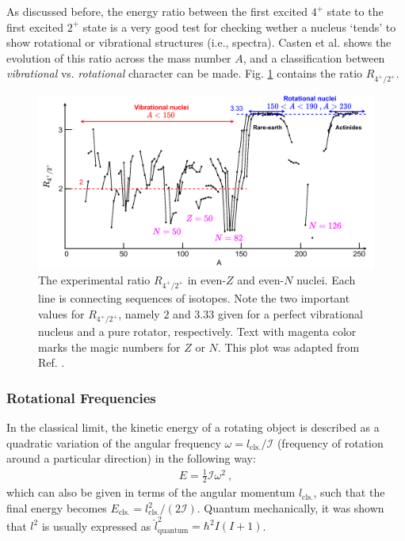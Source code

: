 As discussed before, the energy ratio between the first excited $4^+$ state to the first excited $2^+$ state is a very good test for checking wether a nucleus `tends' to show rotational or vibrational structures (i.e., spectra). Casten et al. \cite{casten2000nuclear} shows the evolution of this ratio across the mass number $A$, and a classification between \emph{vibrational} vs. \emph{rotational} character can be made. Fig. \ref{4state-2state-ratio} contains the ratio $R_{4^+/2^+}$.

\begin{figure}
    \centering
    \includegraphics[scale=0.251]{Chapters/Figures/vibrations_rotations_E42-ratio.pdf}
    \caption{The experimental ratio $R_{4^+/2^+}$ in even-$Z$ and even-$N$ nuclei. Each line is connecting sequences of isotopes. Note the two important values for $R_{4^+/2^+}$, namely $2$ and $3.33$ given for a perfect vibrational nucleus and a pure rotator, respectively. Text with magenta color marks the magic numbers for $Z$ or $N$. This plot was adapted from Ref. \cite{casten2000nuclear}.}
    \label{4state-2state-ratio}
\end{figure}

\subsubsection*{Rotational Frequencies}

In the classical limit, the kinetic energy of a rotating object is described as a quadratic variation of the angular frequency $\omega=l_\text{cls.}/\mathcal{I}$ (frequency of rotation around a particular direction) in the following way:
\begin{align}
    E=\frac{1}{2}\mathcal{I}\omega^2\ ,
\end{align}
which can also be given in terms of the angular momentum $l_\text{cls.}$, such that the final energy becomes $E_\text{cls.}=l_\text{cls.}^2/(2\mathcal{I})$. Quantum mechanically, it was shown that $l^2$ is usually expressed as $\hat{l}^2_\text{quantum}=\hbar^2 I(I+1)$.

